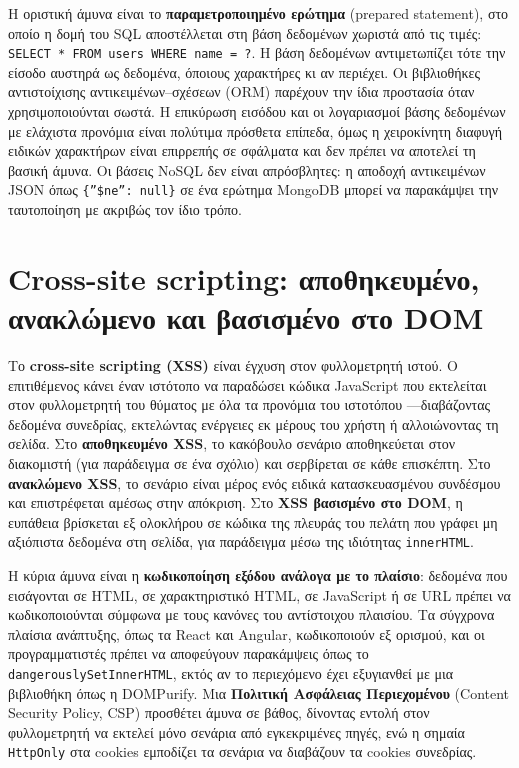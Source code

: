 Η οριστική άμυνα είναι το \textbf{παραμετροποιημένο ερώτημα} (prepared statement), στο οποίο η δομή του SQL αποστέλλεται στη βάση δεδομένων χωριστά από τις τιμές: \texttt{SELECT * FROM users WHERE name = ?}. Η βάση δεδομένων αντιμετωπίζει τότε την είσοδο αυστηρά ως δεδομένα, όποιους χαρακτήρες κι αν περιέχει. Οι βιβλιοθήκες αντιστοίχισης αντικειμένων–σχέσεων (ORM) παρέχουν την ίδια προστασία όταν χρησιμοποιούνται σωστά. Η επικύρωση εισόδου και οι λογαριασμοί βάσης δεδομένων με ελάχιστα προνόμια είναι πολύτιμα πρόσθετα επίπεδα, όμως η χειροκίνητη διαφυγή ειδικών χαρακτήρων είναι επιρρεπής σε σφάλματα και δεν πρέπει να αποτελεί τη βασική άμυνα. Οι βάσεις NoSQL δεν είναι απρόσβλητες: η αποδοχή αντικειμένων JSON όπως \texttt{\{''\$ne'': null\}} σε ένα ερώτημα MongoDB μπορεί να παρακάμψει την ταυτοποίηση με ακριβώς τον ίδιο τρόπο.

\section{Cross-site scripting: αποθηκευμένο, ανακλώμενο και βασισμένο στο DOM}\label{sec:9.3}
Το \textbf{cross-site scripting (XSS)} είναι έγχυση στον φυλλομετρητή ιστού. Ο επιτιθέμενος κάνει έναν ιστότοπο να παραδώσει κώδικα JavaScript που εκτελείται στον φυλλομετρητή του θύματος με όλα τα προνόμια του ιστοτόπου —διαβάζοντας δεδομένα συνεδρίας, εκτελώντας ενέργειες εκ μέρους του χρήστη ή αλλοιώνοντας τη σελίδα. Στο \textbf{αποθηκευμένο XSS}, το κακόβουλο σενάριο αποθηκεύεται στον διακομιστή (για παράδειγμα σε ένα σχόλιο) και σερβίρεται σε κάθε επισκέπτη. Στο \textbf{ανακλώμενο XSS}, το σενάριο είναι μέρος ενός ειδικά κατασκευασμένου συνδέσμου και επιστρέφεται αμέσως στην απόκριση. Στο \textbf{XSS βασισμένο στο DOM}, η ευπάθεια βρίσκεται εξ ολοκλήρου σε κώδικα της πλευράς του πελάτη που γράφει μη αξιόπιστα δεδομένα στη σελίδα, για παράδειγμα μέσω της ιδιότητας \texttt{innerHTML}.

Η κύρια άμυνα είναι η \textbf{κωδικοποίηση εξόδου ανάλογα με το πλαίσιο}: δεδομένα που εισάγονται σε HTML, σε χαρακτηριστικό HTML, σε JavaScript ή σε URL πρέπει να κωδικοποιούνται σύμφωνα με τους κανόνες του αντίστοιχου πλαισίου. Τα σύγχρονα πλαίσια ανάπτυξης, όπως τα React και Angular, κωδικοποιούν εξ ορισμού, και οι προγραμματιστές πρέπει να αποφεύγουν παρακάμψεις όπως το \texttt{dangerouslySetInnerHTML}, εκτός αν το περιεχόμενο έχει εξυγιανθεί με μια βιβλιοθήκη όπως η DOMPurify. Μια \textbf{Πολιτική Ασφάλειας Περιεχομένου} (Content Security Policy, CSP) προσθέτει άμυνα σε βάθος, δίνοντας εντολή στον φυλλομετρητή να εκτελεί μόνο σενάρια από εγκεκριμένες πηγές, ενώ η σημαία \texttt{HttpOnly} στα cookies εμποδίζει τα σενάρια να διαβάζουν τα cookies συνεδρίας.

